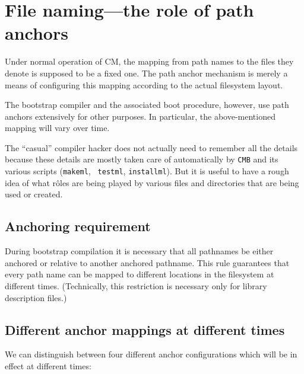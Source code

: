 
\section{File naming---the role of path anchors}

Under normal operation of CM, the mapping from path names to the files
they denote is supposed to be a fixed one.  The path anchor mechanism
is merely a means of configuring this mapping according to the
actual filesystem layout.

The bootstrap compiler and the associated boot procedure, however, use
path anchors extensively for other purposes.  In particular, the
above-mentioned mapping will vary over time.

The ``casual'' compiler hacker does not actually need to remember all
the details because these details are mostly taken care of
automatically by {\tt CMB} and its various scripts ({\tt makeml}, {\tt
testml}, {\tt installml}).  But it is useful to have a rough idea of
what r\^{o}les are being played by various files and directories that
are being used or created.

\subsection{Anchoring requirement}

During bootstrap compilation it is necessary that all pathnames be
either anchored or relative to another anchored pathname.  This rule
guarantees that every path name can be mapped to different locations
in the filesystem at different times.  (Technically, this restriction
is necessary only for library description files.)

\subsection{Different anchor mappings at different times}

We can distinguish between four different anchor configurations which
will be in effect at different times:

